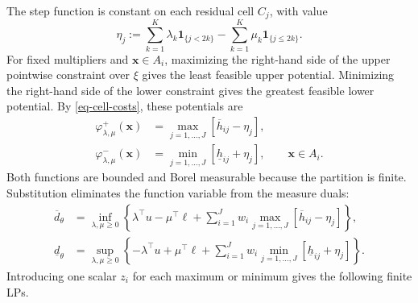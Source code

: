 The step function is constant on each residual cell $C_j$, with value
\begin{equation}
  \eta_j:=\sum_{k=1}^K\lambda_k\mathbf1_{\{j<2k\}}
  -\sum_{k=1}^K\mu_k\mathbf1_{\{j\le2k\}}.
  \label{eq-dual-cell-values}
\end{equation}
For fixed multipliers and $\bm x\in A_i$, maximizing the right-hand side of the upper pointwise constraint over $\xi$ gives the least feasible upper potential. Minimizing the right-hand side of the lower constraint gives the greatest feasible lower potential. By \eqref{eq-cell-costs}, these potentials are
\begin{equation}
  \begin{aligned}
    \varphi^+_{\lambda,\mu}(\bm x)
    &=\max_{j=1,\ldots,J}\left[\overline h_{ij}-\eta_j\right],\\
    \varphi^-_{\lambda,\mu}(\bm x)
    &=\min_{j=1,\ldots,J}\left[\underline h_{ij}+\eta_j\right],
    \qquad\bm x\in A_i.
  \end{aligned}
  \label{eq-optimal-cell-potentials}
\end{equation}
Both functions are bounded and Borel measurable because the partition is finite. Substitution eliminates the function variable from the measure duals:
\begin{align}
  \overline d_\theta
  &=\inf_{\lambda,\mu\ge0}
  \left\{\lambda^\top u-\mu^\top\ell
  +\sum_{i=1}^Jw_i\max_{j=1,\ldots,J}\left[\overline h_{ij}-\eta_j\right]\right\},
  \label{eq-reduced-upper-dual}\\
  \underline d_\theta
  &=\sup_{\lambda,\mu\ge0}
  \left\{-\lambda^\top u+\mu^\top\ell
  +\sum_{i=1}^Jw_i\min_{j=1,\ldots,J}\left[\underline h_{ij}+\eta_j\right]\right\}.
  \label{eq-reduced-lower-dual}
\end{align}
Introducing one scalar $z_i$ for each maximum or minimum gives the following finite LPs.

